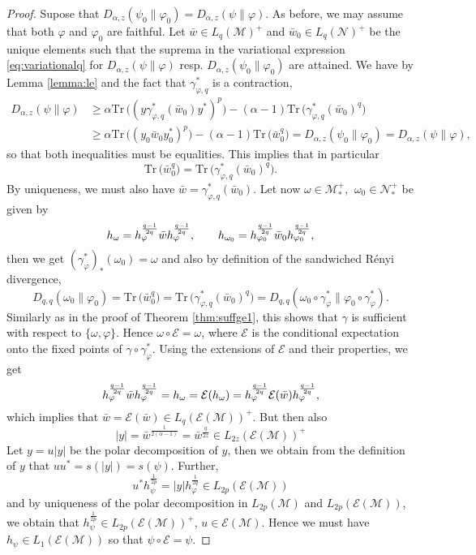 \documentclass[12pt]{article}
\theoremstyle{definition}
\theoremstyle{remark}
\numberwithin{equation}{section}
\def\cE{\mathcal E}
\def\Me{\mathcal M}
\def\Ne{\mathcal N}
\def \Tr{\mathrm{Tr}\,}
\def\ffi{\varphi}
\begin{document}
\begin{proof} Supose that $D_{\alpha,z}(\psi_0\|\varphi_0)=D_{\alpha,z}(\psi\|\varphi)$.
As before, we may assume that both $\varphi$ and $\varphi_0$ are
faithful.  Let $\bar
w\in L_q(\Me)^+$ and $\bar w_0\in L_q(\Ne)^+$ be the unique elements such that the suprema
in the variational expression \eqref{eq:variationalq} for $D_{\alpha,z}(\psi\|\varphi)$ resp.
$D_{\alpha,z}(\psi_0\|\varphi_0)$ are attained. We have by Lemma \ref{lemma:le} and the
fact that $\gamma^*_{\ffi,q}$ is a contraction,
\begin{align*}
D_{\alpha,z}(\psi\|\varphi)&\ge \alpha\Tr\bigl((y\gamma^*_{\varphi,q}(\bar
w_0)y^*)^p\bigr)-(\alpha-1)\Tr
\bigl(\gamma^*_{\varphi,q}(\bar w_0)^q\bigr)\\
&\ge \alpha\Tr\bigr((y_0\bar w_0 y_0^*)^p\bigr)-(\alpha-1)\Tr \bigl(\bar
w_0^q\bigr)=D_{\alpha,z}(\psi_0\|\varphi_0)=D_{\alpha,z}(\psi\|\varphi),
\end{align*}
so that both inequalities must be equalities. This implies that in particular
\[
\Tr \bigl(\bar w_0^q\bigr)=\Tr \bigl(\gamma^*_{\varphi,q}(\bar w_0)^q\bigr).
\]
By uniqueness, we must also have  $\bar w=\gamma^*_{\varphi,q}(\bar w_0)$. Let now
$\omega\in \Me_*^+$, $\
\omega_0\in \Ne_*^+$ be given by
\begin{equation}\label{eq:omega}
h_{\omega}=h_\varphi^{q-1\over 2q}\bar wh_\varphi^{q-1\over 2q},\qquad 
h_{\omega_0}=h_{\varphi_0}^{q-1\over 2q}\bar w_0h_{\varphi_0}^{q-1\over 2q},
\end{equation}
then 
we get  $(\gamma^*_\varphi)_*(\omega_0)=\omega$ and also by
definition of the sandwiched R\'enyi divergence,
\[
D_{q,q}(\omega_0\|\varphi_0)=\Tr \bigl(\bar w_0^q\bigr)=\Tr \bigl(\gamma^*_{\varphi,q}(\bar
w_0)^q\bigr)=D_{q,q}(\omega_0\circ\gamma^*_\ffi\|\varphi_0\circ\gamma^*_\ffi).
\]
Similarly as in the proof of Theorem \ref{thm:suffge1}, this shows that $\gamma$ is sufficient with
respect to $\{\omega,\ffi\}$. Hence $\omega\circ \cE=\omega$, where $\cE$ is the
conditional expectation onto the fixed points of $\gamma\circ\gamma^*_\ffi$.  Using the
extensions of $\cE$ and their
properties, we get
\[
h_\varphi^{q-1\over2q}\bar
wh_\varphi^{q-1\over 2q}=h_\omega=\cE(h_\omega)=h_\varphi^{q-1\over 2q}\cE(\bar
w)h_\varphi^{q-1\over 2q},
\]
which implies that $\bar w=\cE(\bar w)\in L_q(\cE(\Me))^+$. But then also 
\[
|y|=\bar w^{\frac1{2(\alpha-1)}}=\bar w^{\frac{q}{2z}}\in L_{2z}(\cE(\Me))^+
\]
Let $y=u|y|$ be the polar decomposition of $y$, then we obtain from the definition of $y$ that
$uu^*=s(|y|)=s(\psi)$. Further,
\[
u^*h_\psi^{\frac1{2p}}=|y|h_\varphi^{\frac1{2q}}\in L_{2p}(\cE(\Me))
\]
and by uniqueness of the polar decomposition in $L_{2p}(\Me)$ and $L_{2p}(\cE(\Me))$, we
obtain that $h_{\psi}^{\frac1{2p}}\in L_{2p}(\cE(\Me))^+$, $u\in \cE(\Me)$. Hence we must
have $h_\psi\in L_1(\cE(\Me))$ so that $\psi\circ\cE=\psi$.


\end{proof}
\end{document}
